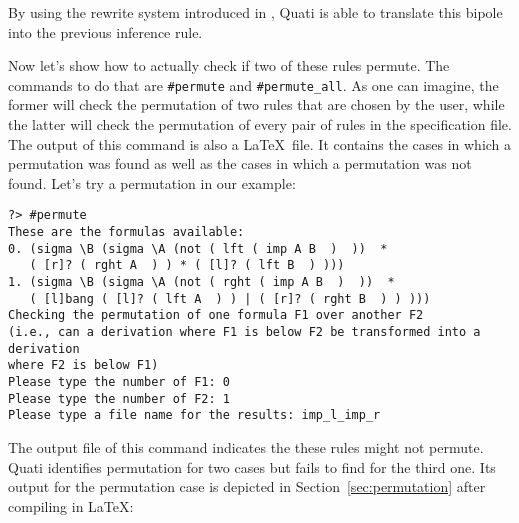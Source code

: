 \documentclass{llncs}
\begin{document}
By using the rewrite system introduced in \cite{nigam13iclp}, Quati is able to
translate this bipole into the previous inference rule.

Now let's show how to actually check if two of these rules permute. The commands
to do that are \texttt{\#permute} and \texttt{\#permute\_all}. As one can
imagine, the former will check the permutation of two rules that are chosen by
the user, while the latter will check the permutation of every pair of rules in
the specification file. The output of this command is also a \LaTeX\ file. It
contains the cases in which a permutation was found as well as the cases in
which a permutation was not found. Let's try a permutation in our example:
\vspace{-1mm}

{\small
\begin{verbatim}
?> #permute
These are the formulas available: 
0. (sigma \B (sigma \A (not ( lft ( imp A B  )  ))  * 
   ( [r]? ( rght A  ) ) * ( [l]? ( lft B  ) )))
1. (sigma \B (sigma \A (not ( rght ( imp A B  )  ))  * 
   ( [l]bang ( [l]? ( lft A  ) ) | ( [r]? ( rght B  ) ) )))
Checking the permutation of one formula F1 over another F2 
(i.e., can a derivation where F1 is below F2 be transformed into a derivation 
where F2 is below F1) 
Please type the number of F1: 0
Please type the number of F2: 1
Please type a file name for the results: imp_l_imp_r
\end{verbatim}
}

The output file of this command indicates the these rules might not permute.
Quati identifies permutation for two cases but fails to find for the third one.
Its output for the permutation case is depicted in Section~\ref{sec:permutation} 
after compiling in \LaTeX:

\begin{landscape}

\end{landscape}

%
\end{document}
